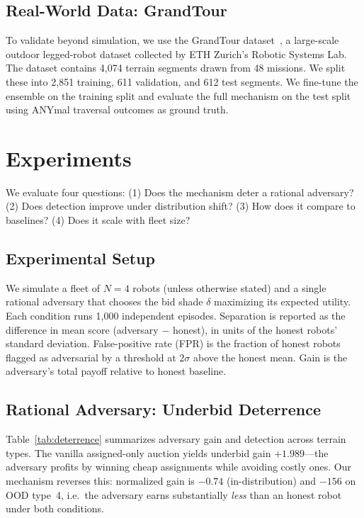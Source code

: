 \documentclass[letterpaper, 10pt, conference]{ieeeconf}
\begin{document}
\subsection{Real-World Data: GrandTour}
To validate beyond simulation, we use the GrandTour dataset~\cite{grandtour2026},
a large-scale outdoor legged-robot dataset collected by ETH Zurich's Robotic
Systems Lab.  The dataset contains 4{,}074 terrain segments drawn from 48
missions.  We split these into 2{,}851 training, 611 validation, and 612 test
segments.  We fine-tune the ensemble on the training split and evaluate the
full mechanism on the test split using ANYmal traversal outcomes as ground
truth.

\section{Experiments}
\label{sec:exp}

We evaluate four questions: (1) Does the mechanism deter a rational adversary?
(2) Does detection improve under distribution shift? (3) How does it compare
to baselines? (4) Does it scale with fleet size?

\subsection{Experimental Setup}
We simulate a fleet of $N=4$ robots (unless otherwise stated) and a single
rational adversary that chooses the bid shade $\delta$ maximizing its expected
utility.  Each condition runs 1{,}000 independent episodes.  Separation is reported
as the difference in mean score (adversary $-$ honest), in units of the honest
robots' standard deviation.  False-positive rate (FPR) is the fraction of
honest robots flagged as adversarial by a threshold at $2\sigma$ above the
honest mean.  Gain is the adversary's total payoff relative to honest
baseline.

\subsection{Rational Adversary: Underbid Deterrence}

Table~\ref{tab:deterrence} summarizes adversary gain and detection across
terrain types.  The vanilla assigned-only auction yields underbid gain
$+1.989$---the adversary profits by winning cheap assignments while avoiding
costly ones.  Our mechanism reverses this: normalized gain is $-0.74$
(in-distribution) and $-156$ on OOD type~4, i.e.\ the adversary earns
substantially \emph{less} than an honest robot under both conditions.
\end{document}
